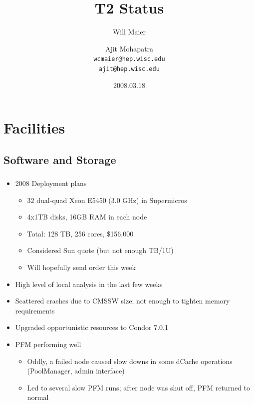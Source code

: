 \documentclass{beamer}
\title{T2 Status}
\author[Maier, Mohapatra]{
    Will Maier \and Ajit Mohapatra\\ 
    {\tt wcmaier@hep.wisc.edu}\\
    {\tt ajit@hep.wisc.edu}}
\institute[Wisconsin]{University of Wisconsin - High Energy Physics}
\date{2008.03.18}
\begin{document}
\begin{frame}
    \titlepage
\end{frame}



\section{Facilities}
\subsection{Software and Storage}
\begin{frame}
\frametitle{}
\begin{itemize}
    \item 2008 Deployment plans
    \begin{itemize}
        \item 32 dual-quad Xeon E5450 (3.0 GHz) in Supermicros
        \item 4x1TB disks, 16GB RAM in each node
        \item Total: 128 TB, 256 cores, \$156,000
        \item Considered Sun quote (but not enough TB/1U)
        \item Will hopefully send order this week
    \end{itemize}
    \item High level of local analysis in the last few weeks
    \item Scattered crashes due to CMSSW size; not enough to tighten memory requirements
    \item Upgraded opportunistic resources to Condor 7.0.1
    \item PFM performing well
    \begin{itemize}
        \item Oddly, a failed node caused slow downs in some dCache operations (PoolManager, admin interface)
        \item Led to several slow PFM runs; after node was shut off, PFM returned to normal
    \end{itemize}
\end{itemize}
\end{frame}
\end{document}

